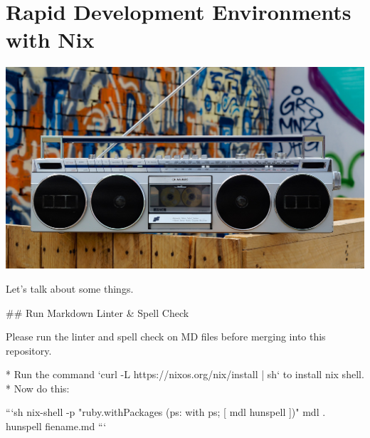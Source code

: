 \chapter{Rapid Development Environments with Nix}

\includegraphics[scale=0.85]{../images/boombox-5693150_1920.jpg}

Let's talk about some things.

## Run Markdown Linter & Spell Check

Please run the linter and spell check on MD files before merging into this
repository.

* Run the command `curl -L https://nixos.org/nix/install | sh` to install nix shell.
* Now do this:

```sh
nix-shell -p "ruby.withPackages (ps: with ps; [ mdl hunspell ])"
mdl .
hunspell fiename.md
```
